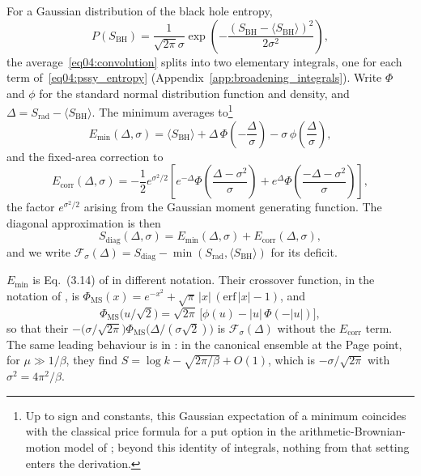 \documentclass[11pt,letterpaper]{article}
\theoremstyle{plain}
\theoremstyle{definition}
\theoremstyle{remark}
\begin{document}
For a Gaussian distribution of the black hole entropy,
\begin{equation}
\label{eq04:gaussian_dist}
P(S_{\mathrm{BH}}) = \frac{1}{\sqrt{2\pi}\sigma} \exp\left(-\frac{(S_{\mathrm{BH}} - \langle S_{\mathrm{BH}}\rangle)^2}{2\sigma^2}\right),
\end{equation}
the average~\eqref{eq04:convolution} splits into two elementary integrals, one for each term of~\eqref{eq04:pssy_entropy} (Appendix~\ref{app:broadening_integrals}). Write $\Phi$ and $\phi$ for the standard normal distribution function and density, and $\Delta = S_{\mathrm{rad}} - \langle S_{\mathrm{BH}}\rangle$. The minimum averages to\footnote{Up to sign and constants, this Gaussian expectation of a minimum coincides with the classical price formula for a put option in the arithmetic-Brownian-motion model of \citet{bachelier1900}; beyond this identity of integrals, nothing from that setting enters the derivation.}
\begin{equation}
\label{eq04:E_min_alt}
E_{\min}(\Delta, \sigma) = \langle S_{\mathrm{BH}}\rangle + \Delta\, \Phi\!\left(-\frac{\Delta}{\sigma}\right) - \sigma\, \phi\!\left(\frac{\Delta}{\sigma}\right),
\end{equation}
and the fixed-area correction to
\begin{equation}
\label{eq04:E_corr}
E_{\mathrm{corr}}(\Delta, \sigma) = -\frac{1}{2} e^{\sigma^2/2} \left[ e^{-\Delta} \Phi\!\left(\frac{\Delta - \sigma^2}{\sigma}\right) + e^{\Delta} \Phi\!\left(\frac{-\Delta - \sigma^2}{\sigma}\right) \right],
\end{equation}
the factor $e^{\sigma^2/2}$ arising from the Gaussian moment generating function. The diagonal approximation is then
\begin{equation}
\label{eq04:S_grav}
S_{\mathrm{diag}}(\Delta, \sigma) = E_{\min}(\Delta, \sigma) + E_{\mathrm{corr}}(\Delta, \sigma),
\end{equation}
and we write $\mathcal{F}_\sigma(\Delta) = S_{\mathrm{diag}} - \min(S_{\mathrm{rad}}, \langle S_{\mathrm{BH}}\rangle)$ for its deficit.

$E_{\min}$ is Eq.~(3.14) of \citet{marolfwangwang2020} in different notation. Their crossover function, in the notation of \citet{murthysrednicki2019}, is $\Phi_{\mathrm{MS}}(x) = e^{-x^2} + \sqrt{\pi}\,|x|\,(\mathrm{erf}\,|x| - 1)$, and
\begin{equation}
\label{eq04:ms_bridge}
\Phi_{\mathrm{MS}}\big(u/\sqrt2\big) = \sqrt{2\pi}\,\big[\phi(u) - |u|\,\Phi(-|u|)\big],
\end{equation}
so that their $-\big(\sigma/\sqrt{2\pi}\big)\Phi_{\mathrm{MS}}\big(\Delta/(\sigma\sqrt2)\big)$ is $\mathcal{F}_\sigma(\Delta)$ without the $E_{\mathrm{corr}}$ term. The same leading behaviour is in \citet{pssyetal2022}: in the canonical ensemble at the Page point, for $\mu \gg 1/\beta$, they find $S = \log k - \sqrt{2\pi/\beta} + O(1)$, which is $-\sigma/\sqrt{2\pi}$ with $\sigma^2 = 4\pi^2/\beta$.
\end{document}
